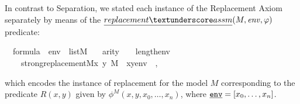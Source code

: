 In contrast to Separation, we stated each instance of the Replacement
Axiom separately by means of the
$\isa{replacement{\uscore}assm}(M,\mathit{env},\phi)$ predicate:
\begin{isabelle}
{\isasymphi}\ {\isasymin}\ formula\ {\isasymlongrightarrow}\ env\ {\isasymin}\ list{\isacharparenleft}{\kern0pt}M{\isacharparenright}{\kern0pt}\ {\isasymlongrightarrow}\isanewline
\ \ arity{\isacharparenleft}{\kern0pt}{\isasymphi}{\isacharparenright}{\kern0pt}\ {\isasymle}\ {}\ {\isacharplus}{\kern0pt}\isactrlsub {\isasymomega}\ length{\isacharparenleft}{\kern0pt}env{\isacharparenright}{\kern0pt}\ {\isasymlongrightarrow}\isanewline
\ \ \ \ strong{\isacharunderscore}{\kern0pt}replacement{\isacharparenleft}{\kern0pt}{\isacharhash}{\kern0pt}{\isacharhash}{\kern0pt}M{\isacharcomma}{\kern0pt}{\isasymlambda}x\ y{\isachardot}{\kern0pt}\ {\isacharparenleft}{\kern0pt}M\ {\isacharcomma}{\kern0pt}\ {\isacharbrackleft}{\kern0pt}x{\isacharcomma}{\kern0pt}y{\isacharbrackright}{\kern0pt}{\isacharat}{\kern0pt}env\ {\isasymTurnstile}\ {\isasymphi}{\isacharparenright}{\kern0pt}{\isacharparenright}{\kern0pt}{\isachardoublequoteclose},
\end{isabelle}
which encodes the instance of replacement for the model $M$
corresponding to the predicate $R(x,y)$ given by
$\phi^M(x,y,x_0,\dots,x_n)$, where $\isatt{env} = [x_0,\dots,x_n]$.

